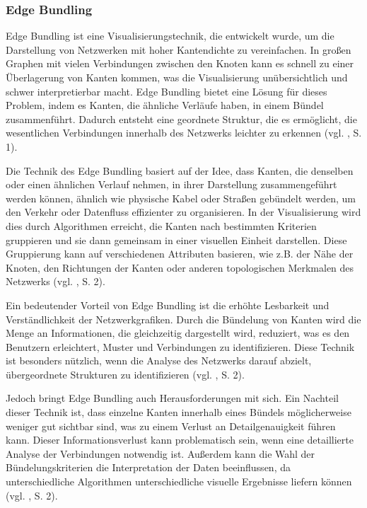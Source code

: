 \subsubsection{Edge Bundling}

Edge Bundling ist eine Visualisierungstechnik, die entwickelt wurde, um die Darstellung von Netzwerken mit hoher Kantendichte zu vereinfachen. In großen Graphen mit vielen Verbindungen zwischen den Knoten kann es schnell zu einer Überlagerung von Kanten kommen, was die Visualisierung unübersichtlich und schwer interpretierbar macht. Edge Bundling bietet eine Lösung für dieses Problem, indem es Kanten, die ähnliche Verläufe haben, in einem Bündel zusammenführt. Dadurch entsteht eine geordnete Struktur, die es ermöglicht, die wesentlichen Verbindungen innerhalb des Netzwerks leichter zu erkennen (vgl. \cite{edgeBundling:Holten}, S. 1).

Die Technik des Edge Bundling basiert auf der Idee, dass Kanten, die denselben oder einen ähnlichen Verlauf nehmen, in ihrer Darstellung zusammengeführt werden können, ähnlich wie physische Kabel oder Straßen gebündelt werden, um den Verkehr oder Datenfluss effizienter zu organisieren. In der Visualisierung wird dies durch Algorithmen erreicht, die Kanten nach bestimmten Kriterien gruppieren und sie dann gemeinsam in einer visuellen Einheit darstellen. Diese Gruppierung kann auf verschiedenen Attributen basieren, wie z.B. der Nähe der Knoten, den Richtungen der Kanten oder anderen topologischen Merkmalen des Netzwerks (vgl. \cite{edgeBundling:Holten}, S. 2).

Ein bedeutender Vorteil von Edge Bundling ist die erhöhte Lesbarkeit und Verständlichkeit der Netzwerkgrafiken. Durch die Bündelung von Kanten wird die Menge an Informationen, die gleichzeitig dargestellt wird, reduziert, was es den Benutzern erleichtert, Muster und Verbindungen zu identifizieren. Diese Technik ist besonders nützlich, wenn die Analyse des Netzwerks darauf abzielt, übergeordnete Strukturen  zu identifizieren (vgl. \cite{edgeBundling:Holten}, S. 2).

Jedoch bringt Edge Bundling auch Herausforderungen mit sich. Ein Nachteil dieser Technik ist, dass einzelne Kanten innerhalb eines Bündels möglicherweise weniger gut sichtbar sind, was zu einem Verlust an Detailgenauigkeit führen kann. Dieser Informationsverlust kann problematisch sein, wenn eine detaillierte Analyse der Verbindungen notwendig ist. Außerdem kann die Wahl der Bündelungskriterien die Interpretation der Daten beeinflussen, da unterschiedliche Algorithmen unterschiedliche visuelle Ergebnisse liefern können (vgl. \cite{edgeBundling:Holten}, S. 2).

